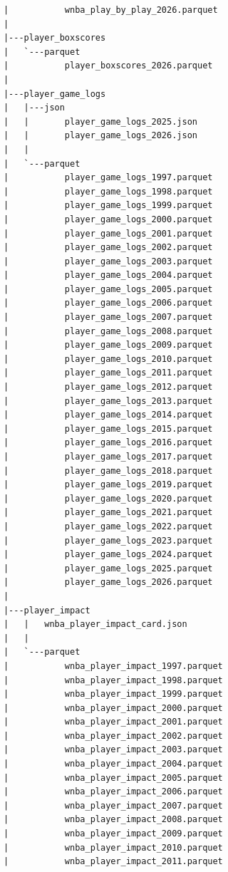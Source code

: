 \begin{lstlisting}
      |           wnba_play_by_play_2026.parquet
      |
      |---player_boxscores
      |   `---parquet
      |           player_boxscores_2026.parquet
      |
      |---player_game_logs
      |   |---json
      |   |       player_game_logs_2025.json
      |   |       player_game_logs_2026.json
      |   |
      |   `---parquet
      |           player_game_logs_1997.parquet
      |           player_game_logs_1998.parquet
      |           player_game_logs_1999.parquet
      |           player_game_logs_2000.parquet
      |           player_game_logs_2001.parquet
      |           player_game_logs_2002.parquet
      |           player_game_logs_2003.parquet
      |           player_game_logs_2004.parquet
      |           player_game_logs_2005.parquet
      |           player_game_logs_2006.parquet
      |           player_game_logs_2007.parquet
      |           player_game_logs_2008.parquet
      |           player_game_logs_2009.parquet
      |           player_game_logs_2010.parquet
      |           player_game_logs_2011.parquet
      |           player_game_logs_2012.parquet
      |           player_game_logs_2013.parquet
      |           player_game_logs_2014.parquet
      |           player_game_logs_2015.parquet
      |           player_game_logs_2016.parquet
      |           player_game_logs_2017.parquet
      |           player_game_logs_2018.parquet
      |           player_game_logs_2019.parquet
      |           player_game_logs_2020.parquet
      |           player_game_logs_2021.parquet
      |           player_game_logs_2022.parquet
      |           player_game_logs_2023.parquet
      |           player_game_logs_2024.parquet
      |           player_game_logs_2025.parquet
      |           player_game_logs_2026.parquet
      |
      |---player_impact
      |   |   wnba_player_impact_card.json
      |   |
      |   `---parquet
      |           wnba_player_impact_1997.parquet
      |           wnba_player_impact_1998.parquet
      |           wnba_player_impact_1999.parquet
      |           wnba_player_impact_2000.parquet
      |           wnba_player_impact_2001.parquet
      |           wnba_player_impact_2002.parquet
      |           wnba_player_impact_2003.parquet
      |           wnba_player_impact_2004.parquet
      |           wnba_player_impact_2005.parquet
      |           wnba_player_impact_2006.parquet
      |           wnba_player_impact_2007.parquet
      |           wnba_player_impact_2008.parquet
      |           wnba_player_impact_2009.parquet
      |           wnba_player_impact_2010.parquet
      |           wnba_player_impact_2011.parquet

\end{lstlisting}
